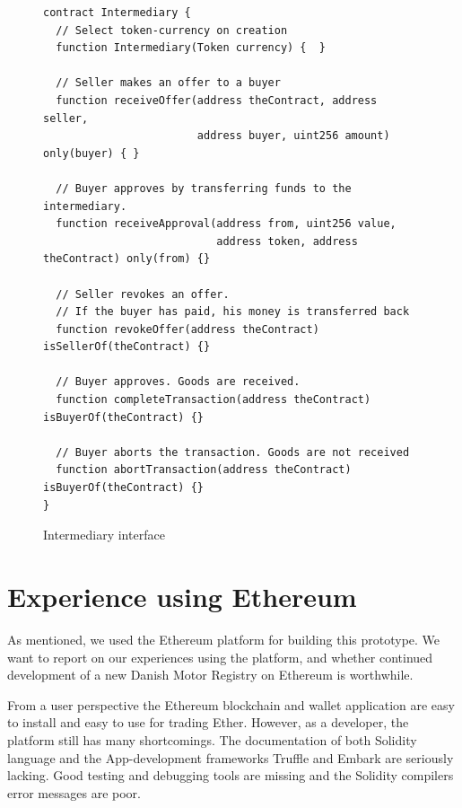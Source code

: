 \documentclass[oneside,a4paper,10pts,article]{memoir}
\begin{document}
\begin{figure}
  \begin{lstlisting}
contract Intermediary {
  // Select token-currency on creation
  function Intermediary(Token currency) {  }

  // Seller makes an offer to a buyer
  function receiveOffer(address theContract, address seller,
                        address buyer, uint256 amount) only(buyer) { }

  // Buyer approves by transferring funds to the intermediary.
  function receiveApproval(address from, uint256 value,
                           address token, address theContract) only(from) {}

  // Seller revokes an offer.
  // If the buyer has paid, his money is transferred back
  function revokeOffer(address theContract) isSellerOf(theContract) {}
  
  // Buyer approves. Goods are received.
  function completeTransaction(address theContract) isBuyerOf(theContract) {}

  // Buyer aborts the transaction. Goods are not received
  function abortTransaction(address theContract) isBuyerOf(theContract) {}
}
  \end{lstlisting}
  \caption{Intermediary interface}
  \label{fig:intermediary}
\end{figure}

\chapter{Experience using Ethereum}
\label{sec:ethereum-experiences}
As mentioned, we used the Ethereum platform for building this
prototype. We want to report on our experiences using the platform,
and whether continued development of a new Danish Motor Registry on
Ethereum is worthwhile. 

From a user perspective the Ethereum blockchain and wallet application
are easy to install and easy to use for trading Ether. However, as a
developer, the platform still has many shortcomings. The documentation
of both Solidity language and the App-development frameworks Truffle
and Embark are seriously lacking. Good testing and debugging tools are
missing and the Solidity compilers error messages are poor.
\end{document}

